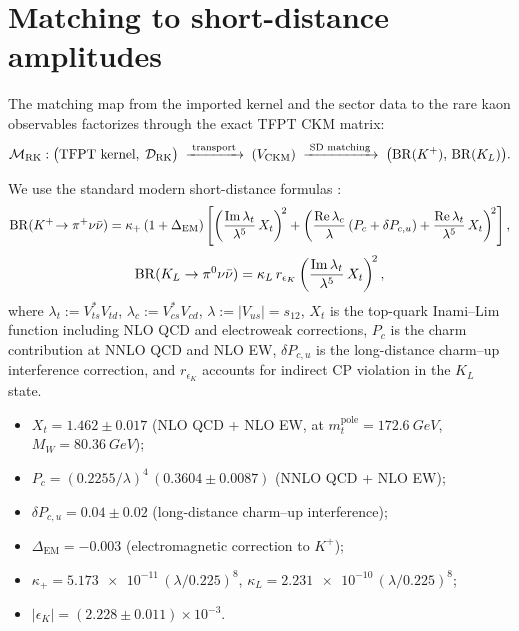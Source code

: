 \section{Matching to short-distance amplitudes}
\label{sec:matching}

The matching map from the imported kernel and the sector data to the rare
kaon observables factorizes through the exact TFPT CKM matrix:
\begin{equation}
\label{eq:matching-map}
\mathcal M_{\mathrm{RK}}
:
\bigl(\text{TFPT kernel},\;\mathcal D_{\mathrm{RK}}\bigr)
\;\xrightarrow{\;\text{transport}\;}\;
(V_{\mathrm{CKM}})
\;\xrightarrow{\;\text{SD matching}\;}\;
\bigl(\mathrm{BR}(K^+),\,\mathrm{BR}(K_L)\bigr).
\end{equation}

\begin{definition}
\label{def:br-formulas}
We use the standard modern short-distance formulas \cite{BrodGorbahnStamou}:
\begin{equation}
\label{eq:br-kplus}
\mathrm{BR}(K^+\!\to\pi^+\nu\bar\nu)
=
\kappa_+\,(1+\Delta_{\mathrm{EM}})
\left[
\left(\frac{\operatorname{Im}\lambda_t}{\lambda^5}\,X_t\right)^{\!2}
+
\left(
\frac{\operatorname{Re}\lambda_c}{\lambda}\,(P_c+\delta P_{c,u})
+
\frac{\operatorname{Re}\lambda_t}{\lambda^5}\,X_t
\right)^{\!2}
\right],
\end{equation}
\begin{equation}
\label{eq:br-kl}
\mathrm{BR}(K_L\to\pi^0\nu\bar\nu)
=
\kappa_L\,r_{\epsilon_K}
\left(\frac{\operatorname{Im}\lambda_t}{\lambda^5}\,X_t\right)^{\!2},
\end{equation}
where $\lambda_t:=V_{ts}^*V_{td}$, $\lambda_c:=V_{cs}^*V_{cd}$,
$\lambda:=|V_{us}|=s_{12}$,
$X_t$ is the top-quark Inami--Lim function including NLO QCD and
electroweak corrections, $P_c$ is the charm contribution at NNLO QCD
and NLO EW, $\delta P_{c,u}$ is the long-distance charm--up
interference correction, and $r_{\epsilon_K}$ accounts for indirect
CP violation in the $K_L$ state.
\end{definition}

\begin{tcolorbox}[colback=gray!4, colframe=gray!60, breakable,
    title={\textbf{Short-distance input parameters}}, fonttitle=\bfseries]
\begin{itemize}[leftmargin=1.6em, itemsep=0.3em]
\item $X_t = 1.462\pm 0.017$ \quad (NLO QCD + NLO EW, at
      $m_t^{\mathrm{pole}}=\SI{172.6}{GeV}$, $M_W=\SI{80.36}{GeV}$);
\item $P_c = (0.2255/\lambda)^4\,(0.3604\pm 0.0087)$ \quad (NNLO QCD + NLO EW);
\item $\delta P_{c,u}=0.04\pm 0.02$ \quad (long-distance charm--up interference);
\item $\Delta_{\mathrm{EM}}=-0.003$ \quad (electromagnetic correction to $K^+$);
\item $\kappa_+=\num{5.173e-11}\,(\lambda/0.225)^8$,\;
      $\kappa_L=\num{2.231e-10}\,(\lambda/0.225)^8$;
\item $|\epsilon_K|=(\num{2.228}\pm\num{0.011})\times 10^{-3}$.
\end{itemize}
\end{tcolorbox}

